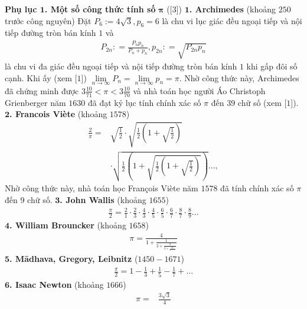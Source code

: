 \begin{multicols}{2}
	\textbf{\color{lichsutoanhoc}Phụ lục $\pmb1$. Một số công thức tính số} $\pmb{\pi}$ ([$3$])
	\vskip 0.1cm
	$\pmb1$\textbf{\color{lichsutoanhoc}. Archimedes} (khoảng $250$ trước công nguyên)
	\vskip 0.1cm
	Đặt  $P_6 := 4\sqrt{3}, p_6 = 6$ là chu vi lục giác đều ngoại tiếp và nội tiếp đường tròn bán kính $1$ và
	\begin{align*}
		{P_{2n}}: = \frac{{{P_n}{p_n}}}{{{P_n} + {p_n}}}, {p_{2n}}: = \sqrt {{P_{2n}}{p_n}} 
	\end{align*}
	là chu vi đa giác đều ngoại tiếp và nội tiếp đường tròn bán kính $1$ khi gấp đôi số cạnh. Khi ấy (xem [$1$])  $\mathop {\lim }\limits_{n \to \infty } {P_n} = \mathop {\lim }\limits_{n \to \infty } {p_n} = \pi$.
	\vskip 0.1cm
	Nhờ công thức này, Archimedes đã chứng minh được $3\frac{10}{71} < \pi < 3\frac{10}{70}$ và nhà toán học người Áo Christoph Grienberger năm $1630$ đã đạt kỷ lục tính chính xác  số $\pi$  đến $39$ chữ số (xem [$1$]).
	\vskip 0.1cm
	$\pmb2$\textbf{\color{lichsutoanhoc}. Francois Viète} (khoảng $1578$)
	\begin{align*}
		\frac{2}{\pi } =& \sqrt {\frac{1}{2}}  \cdot \sqrt {\frac{1}{2}\left( {1 + \sqrt {\frac{1}{2}} } \right)}  \\
		&\cdot \sqrt {\frac{1}{2}\left( {1 + \sqrt {\frac{1}{2}\left( {1 + \sqrt {\frac{1}{2}} } \right)} } \right)} ...,
	\end{align*}
	Nhờ công thức này, nhà toán học François Viète năm $1578$ đã tính chính xác số $\pi$  đến $9$ chữ số.
	\vskip 0.1cm
	$\pmb3$\textbf{\color{lichsutoanhoc}. John Wallis} (khoảng $1655$)
	\begin{align*}
		\frac{\pi }{2} = \frac{2}{1} \cdot \frac{2}{3} \cdot \frac{4}{3} \cdot \frac{4}{5} \cdot \frac{6}{5} \cdot \frac{6}{7} \cdot \frac{8}{7} \cdot \frac{8}{9}...
	\end{align*}
	$\pmb4$\textbf{\color{lichsutoanhoc}. William Brouncker} (khoảng $1658$)
	\begin{align*}
		\pi  = \frac{4}{{1 + \frac{1}{{2 + \frac{9}{{2 + \frac{{25}}{{2 + ...}}}}}}}}
	\end{align*}
	$\pmb5$\textbf{\color{lichsutoanhoc}. Mādhava, Gregory, Leibnitz} ($1450-1671$)
	\begin{align*}
		\frac{\pi }{2} = 1 - \frac{1}{3} + \frac{1}{5} - \frac{1}{7} + ...
	\end{align*}
	$\pmb6$\textbf{\color{lichsutoanhoc}. Isaac Newton} (khoảng $1666$)
	\begin{align*}
		\pi  =& \frac{{3\sqrt 3 }}{4} \\

\end{align*}
\end{multicols}
